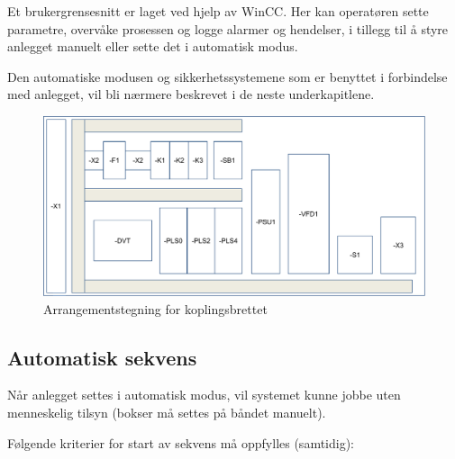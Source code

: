 \documentclass[Visionprosjekt.tex]{subfiles}
\begin{document}
Et brukergrensesnitt er laget ved hjelp av WinCC. Her kan operatøren sette parametre, overvåke prosessen og logge alarmer og hendelser, i tillegg til å  styre anlegget manuelt  eller sette det i automatisk modus. 


Den automatiske modusen og sikkerhetssystemene som er benyttet i forbindelse med anlegget,  vil bli nærmere beskrevet i de neste underkapitlene.


\begin{figure}[ht]
	\centering
		\includegraphics[width=\textwidth]{bilder/arrangementstegning.pdf}
	\caption{Arrangementstegning for koplingsbrettet}
	\label{fig:Arrangementstegning}
\end{figure}







\subsection{Automatisk sekvens}
\label{subsec:auto}

Når anlegget settes i automatisk modus, vil systemet kunne jobbe uten menneskelig tilsyn (bokser må settes på båndet manuelt).

Følgende kriterier for start av sekvens må oppfylles (samtidig):
\end{document}
